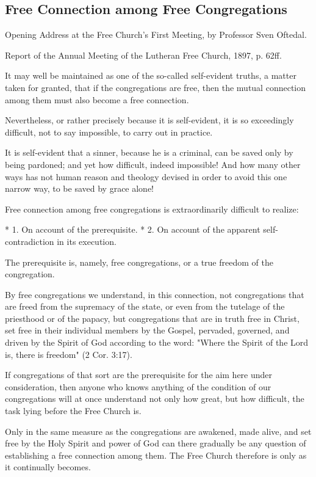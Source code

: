

\subsection{Free Connection among Free Congregations}

Opening Address at the Free Church’s First Meeting,
by Professor Sven Oftedal.

Report of the Annual Meeting of the Lutheran Free Church, 1897, p. 62ff.

It may well be maintained as one of the so-called self-evident truths, a matter taken for granted, that if the congregations are free, then the mutual connection among them must also become a free connection.

Nevertheless, or rather precisely because it is self-evident, it is so exceedingly difficult, not to say impossible, to carry out in practice.

It is self-evident that a sinner, because he is a criminal, can be saved only by being pardoned; and yet how difficult, indeed impossible! And how many other ways has not human reason and theology devised in order to avoid this one narrow way, to be saved by grace alone!

Free connection among free congregations is extraordinarily difficult to realize:

* 1. On account of the prerequisite.
* 2. On account of the apparent self-contradiction in its execution.

The prerequisite is, namely, free congregations, or a true freedom of the congregation.

By free congregations we understand, in this connection, not congregations that are freed from the supremacy of the state, or even from the tutelage of the priesthood or of the papacy, but congregations that are in truth free in Christ, set free in their individual members by the Gospel, pervaded, governed, and driven by the Spirit of God according to the word: "Where the Spirit of the Lord is, there is freedom" (2 Cor. 3:17).

If congregations of that sort are the prerequisite for the aim here under consideration, then anyone who knows anything of the condition of our congregations will at once understand not only how great, but how difficult, the task lying before the Free Church is.

Only in the same measure as the congregations are awakened, made alive, and set free by the Holy Spirit and power of God can there gradually be any question of establishing a free connection among them. The Free Church therefore is only as it continually becomes.

